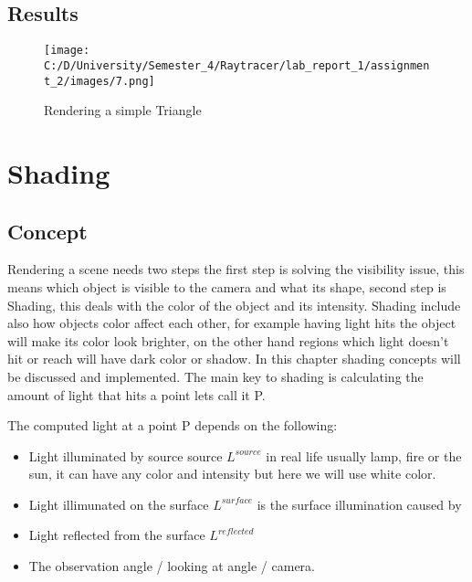 \documentclass{article}
\begin{document}
	
	\subsection{Results}
	\begin{figure}[H]
		\begin{center}
			\texttt{[image: C:/D/University/Semester\_4/Raytracer/lab\_report\_1/assignment\_2/images/7.png]}
			
			\caption{Rendering a simple Triangle}
			\label{fig:boat1}
		\end{center}
	\end{figure}

\clearpage


\section{Shading}
\subsection{Concept}

Rendering a scene needs two steps the first step is solving the visibility issue, this means which object is visible to the camera and what its shape, second step is Shading, this deals with the color of the object and its intensity. Shading include also how objects color affect each other, for example having light hits the object will make its color look brighter, on the other hand regions which light doesn't hit or reach will have dark color or shadow. In this chapter shading concepts will be discussed and implemented.  The main key to shading is calculating the amount of light that hits a point lets call it P. 

The computed light at a point P depends on the following: 

\begin{itemize}
	\item Light illuminated by source source  $L^{source}$  in real life usually lamp, fire or the sun, it can have any color and intensity but here we will use white color. 
	\item Light illimunated on the surface $L^{surface}$ is the surface illumination caused by
	\item Light reflected from the surface $L^{reflected}$
	\item The observation angle / looking at angle / camera. 
\end{itemize}
\end{document}

